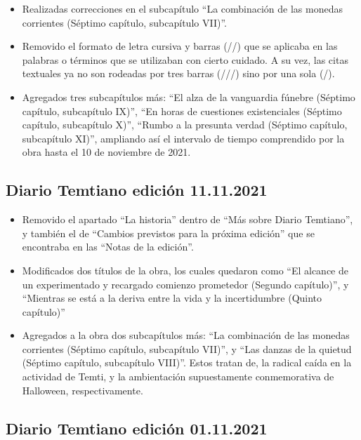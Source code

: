 \documentclass[
  spanish,
]{book}
\begin{document}
\begin{itemize}
\item
  Realizadas correcciones en el subcapítulo ``La combinación de las monedas corrientes (Séptimo capítulo, subcapítulo VII)''.
\item
  Removido el formato de letra cursiva y barras (//) que se aplicaba en las palabras o términos que se utilizaban con cierto cuidado. A su vez, las citas textuales ya no son rodeadas por tres barras (///) sino por una sola (/).
\item
  Agregados tres subcapítulos más: ``El alza de la vanguardia fúnebre (Séptimo capítulo, subcapítulo IX)'', ``En horas de cuestiones existenciales (Séptimo capítulo, subcapítulo X)'', ``Rumbo a la presunta verdad (Séptimo capítulo, subcapítulo XI)'', ampliando así el intervalo de tiempo comprendido por la obra hasta el 10 de noviembre de 2021.
\end{itemize}

\hypertarget{diario-temtiano-ediciuxf3n-11.11.2021}{%
\subsection*{Diario Temtiano edición 11.11.2021}\label{diario-temtiano-ediciuxf3n-11.11.2021}}

\begin{itemize}
\item
  Removido el apartado ``La historia'' dentro de ``Más sobre Diario Temtiano'', y también el de ``Cambios previstos para la próxima edición'' que se encontraba en las ``Notas de la edición''.
\item
  Modificados dos títulos de la obra, los cuales quedaron como ``El alcance de un experimentado y recargado comienzo prometedor (Segundo capítulo)'', y ``Mientras se está a la deriva entre la vida y la incertidumbre (Quinto capítulo)''
\item
  Agregados a la obra dos subcapítulos más: ``La combinación de las monedas corrientes (Séptimo capítulo, subcapítulo VII)'', y ``Las danzas de la quietud (Séptimo capítulo, subcapítulo VIII)''. Estos tratan de, la radical caída en la actividad de Temti, y la ambientación supuestamente conmemorativa de Halloween, respectivamente.
\end{itemize}

\hypertarget{diario-temtiano-ediciuxf3n-01.11.2021}{%
\subsection*{Diario Temtiano edición 01.11.2021}\label{diario-temtiano-ediciuxf3n-01.11.2021}}
\end{document}

